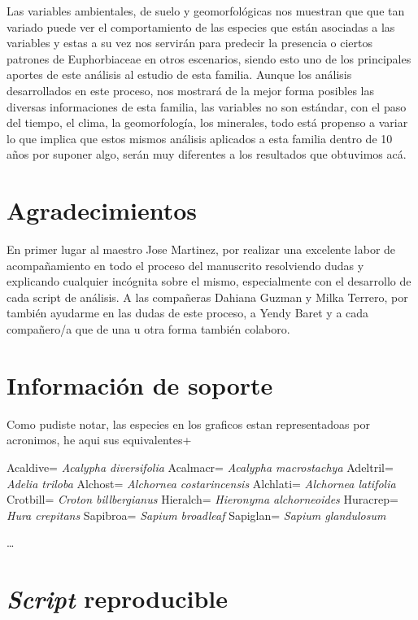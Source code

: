 \documentclass[11pt,]{article}
\begin{document}
Las variables ambientales, de suelo y geomorfológicas nos muestran que
que tan variado puede ver el comportamiento de las especies que están
asociadas a las variables y estas a su vez nos servirán para predecir la
presencia o ciertos patrones de Euphorbiaceae en otros escenarios,
siendo esto uno de los principales aportes de este análisis al estudio
de esta familia. Aunque los análisis desarrollados en este proceso, nos
mostrará de la mejor forma posibles las diversas informaciones de esta
familia, las variables no son estándar, con el paso del tiempo, el
clima, la geomorfología, los minerales, todo está propenso a variar lo
que implica que estos mismos análisis aplicados a esta familia dentro de
10 años por suponer algo, serán muy diferentes a los resultados que
obtuvimos acá.

\section{Agradecimientos}\label{agradecimientos}

En primer lugar al maestro Jose Martinez, por realizar una excelente
labor de acompañamiento en todo el proceso del manuscrito resolviendo
dudas y explicando cualquier incógnita sobre el mismo, especialmente con
el desarrollo de cada script de análisis. A las compañeras Dahiana
Guzman y Milka Terrero, por también ayudarme en las dudas de este
proceso, a Yendy Baret y a cada compañero/a que de una u otra forma
también colaboro.

\section{Información de soporte}\label{informaciuxf3n-de-soporte}

Como pudiste notar, las especies en los graficos estan representadoas
por acronimos, he aqui sus equivalentes+

Acaldive= \emph{Acalypha diversifolia} Acalmacr= \emph{Acalypha
macrostachya} Adeltril= \emph{Adelia triloba} Alchost= \emph{Alchornea
costarincensis} Alchlati= \emph{Alchornea latifolia} Crotbill=
\emph{Croton billbergianus} Hieralch= \emph{Hieronyma alchorneoides}
Huracrep= \emph{Hura crepitans} Sapibroa= \emph{Sapium broadleaf}
Sapiglan= \emph{Sapium glandulosum}

\ldots

\section{\texorpdfstring{\emph{Script}
reproducible}{Script reproducible}}\label{script-reproducible}
\end{document}

